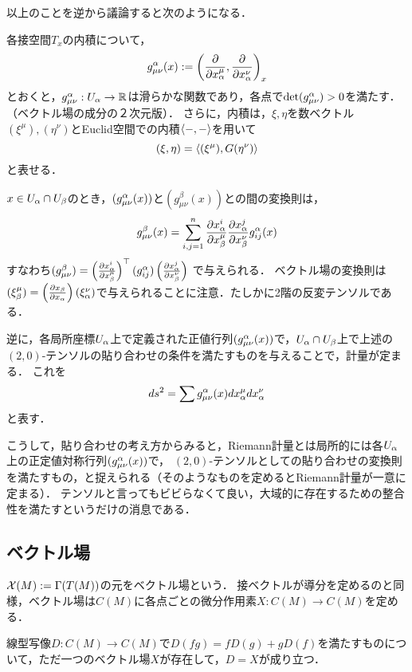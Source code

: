 \documentclass[uplatex,dvipdfmx]{jsreport}
\begin{document}
以上のことを逆から議論すると次のようになる．

\begin{notation}
    各接空間$T_x$の内積について，
    \[g_{\mu\nu}^\alpha(x):=\left(\frac{\partial }{\partial x_\alpha^\mu},\frac{\partial }{\partial x^\nu_\alpha}\right)_x\]
    とおくと，$g_{\mu\nu}^\alpha:U_\alpha\to\mathbb{R}$は滑らかな関数であり，各点で$\det(g^\alpha_{\mu\nu})>0$を満たす．
    （ベクトル場の成分の２次元版）．
    さらに，内積は，$\xi,\eta$を数ベクトル$(\xi^\mu),(\eta^\nu)$とEuclid空間での内積$\langle-,-\rangle$を用いて
    \[(\xi,\eta)=\langle(\xi^\mu),G(\eta^\nu)\rangle\]
    と表せる．

    $x\in U_\alpha\cap U_\beta$のとき，$(g_{\mu\nu}^\alpha(x))$と$(g_{\mu\nu}^\beta(x))$との間の変換則は，
    \[g_{\mu\nu}^\beta(x)=\sum^n_{i,j=1}\frac{\partial x_\alpha^i}{\partial x_\beta^\mu}\frac{\partial x_\alpha^j}{\partial x^\nu_\beta}g_{ij}^\alpha(x)\]
    すなわち$(g^\beta_{\mu\nu})=\left(\frac{\partial x^i_\alpha}{\partial x^\mu_\beta}\right)^\top(g_{ij}^\alpha)\left(\frac{\partial x^j_\alpha}{\partial x_\beta^\nu}\right)$
    で与えられる．
    ベクトル場の変換則は$(\xi_\beta^\mu)=\left(\frac{\partial x_\beta}{\partial x_\alpha}\right)(\xi_\alpha^\nu)$で与えられることに注意．たしかに2階の反変テンソルである．

    逆に，各局所座標$U_\alpha$上で定義された正値行列$(g_{\mu\nu}^\alpha(x))$で，$U_\alpha\cap U_\beta$上で上述の$(2,0)$-テンソルの貼り合わせの条件を満たすものを与えることで，計量が定まる．
    これを
    \[ds^2=\sum g_{\mu\nu}^\alpha(x)dx^\mu_\alpha dx_\alpha^\nu\]
    と表す．
\end{notation}
\begin{remarks}
    こうして，貼り合わせの考え方からみると，Riemann計量とは局所的には各$U_\alpha$上の正定値対称行列$(g_{\mu\nu}^\alpha(x))$で，
    $(2,0)$-テンソルとしての貼り合わせの変換則を満たすもの，と捉えられる（そのようなものを定めるとRiemann計量が一意に定まる）．
    テンソルと言ってもビビらなくて良い，大域的に存在するための整合性を満たすというだけの消息である．
\end{remarks}

\subsection{ベクトル場}

\begin{definition}
    $\mathcal{X}(M):=\Gamma(T(M))$の元をベクトル場という．
    接ベクトルが導分を定めるのと同様，ベクトル場は$C(M)$に各点ごとの微分作用素$X:C(M)\to C(M)$を定める．
\end{definition}

\begin{theorem}
    線型写像$D:C(M)\to C(M)$で$D(fg)=fD(g)+gD(f)$を満たすものについて，ただ一つのベクトル場$X$が存在して，$D=X$が成り立つ．
\end{theorem}
\end{document}
